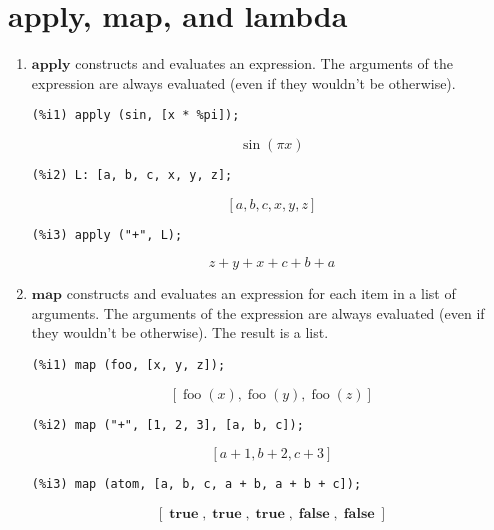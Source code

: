 \documentclass[12pt,leqno]{article}
\begin{document}
\section{apply, map, and lambda}

\begin{enumerate}

\item $\mathbf{apply}$ constructs and evaluates an expression.
The arguments of the expression are always evaluated (even if they wouldn't be otherwise).
\begin{verbatim}
(%i1) apply (sin, [x * %pi]);
\end{verbatim}
\begin{dmath}[number={\(\mathop{\mathrm{\%o}_{1}}\)}]
\sin \left(\pi x\right)
\end{dmath}
\begin{verbatim}
(%i2) L: [a, b, c, x, y, z];
\end{verbatim}
\begin{dmath}[number={\(\mathop{\mathrm{\%o}_{2}}\)}]
\left[a, b, c, x, y, z\right]
\end{dmath}
\begin{verbatim}
(%i3) apply ("+", L);
\end{verbatim}
\begin{dmath}[number={\(\mathop{\mathrm{\%o}_{3}}\)}]
z+y+x+c+b+a
\end{dmath}


\item $\mathbf{map}$ constructs and evaluates an expression for each item in a list of arguments.
The arguments of the expression are always evaluated (even if they wouldn't be otherwise).
The result is a list.
\begin{verbatim}
(%i1) map (foo, [x, y, z]);
\end{verbatim}
\begin{dmath}[number={\(\mathop{\mathrm{\%o}_{1}}\)}]
\left[\mathop{\mathrm{foo}}\left(x\right), \mathop{\mathrm{foo}}\left(y\right), \mathop{\mathrm{foo}}\left(z\right)\right]
\end{dmath}
\begin{verbatim}
(%i2) map ("+", [1, 2, 3], [a, b, c]);
\end{verbatim}
\begin{dmath}[number={\(\mathop{\mathrm{\%o}_{2}}\)}]
\left[a+1, b+2, c+3\right]
\end{dmath}
\begin{verbatim}
(%i3) map (atom, [a, b, c, a + b, a + b + c]);
\end{verbatim}
\begin{dmath}[number={\(\mathop{\mathrm{\%o}_{3}}\)}]
\left[\mathop{\mathbf{true}}, \mathop{\mathbf{true}}, \mathop{\mathbf{true}}, \mathop{\mathbf{false}}, \mathop{\mathbf{false}}\right]
\end{dmath}



\end{enumerate}
\end{document}
